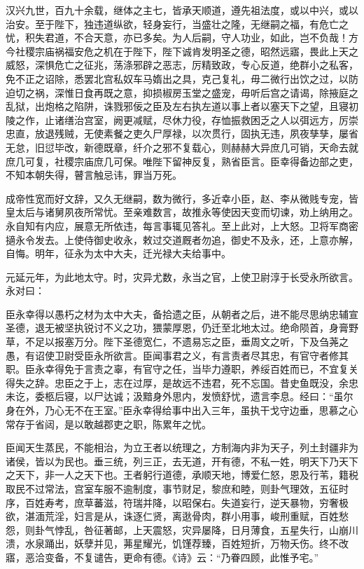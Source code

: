 \documentclass[]{article}
\begin{document}
汉兴九世，百九十余载，继体之主七，皆承天顺道，遵先祖法度，或以中兴，或以治安。至于陛下，独违道纵欲，轻身妄行，当盛壮之隆，无继嗣之福，有危亡之忧，积失君道，不合天意，亦已多矣。为人后嗣，守人功业，如此，岂不负哉！方今社稷宗庙祸福安危之机在于陛下，陛下诚肯发明圣之德，昭然远寤，畏此上天之威怒，深惧危亡之征兆，荡涤邪辟之恶志，厉精致政，专心反道，绝群小之私客，免不正之诏除，悉罢北宫私奴车马媠出之具，克己复礼，毋二微行出饮之过，以防迫切之祸，深惟日食再既之意，抑损椒房玉堂之盛宠，毋听后宫之请谒，除掖庭之乱狱，出炮格之陷阱，诛戮邪佞之臣及左右执左道以事上者以塞天下之望，且寝初陵之作，止诸缮治宫室，阙更减赋，尽休力役，存恤振救困乏之人以弭远方，厉崇忠直，放退残贼，无使素餐之吏久尸厚禄，以次贯行，固执无违，夙夜孳孳，屡省无怠，旧愆毕改，新德既章，纤介之邪不复载心，则赫赫大异庶几可销，天命去就庶几可复，社稷宗庙庶几可保。唯陛下留神反复，熟省臣言。臣幸得备边部之吏，不知本朝失得，瞽言触忌讳，罪当万死。

成帝性宽而好文辞，又久无继嗣，数为微行，多近幸小臣，赵、李从微贱专宠，皆皇太后与诸舅夙夜所常忧。至亲难数言，故推永等使因天变而切谏，劝上纳用之。永自知有内应，展意无所依违，每言事辄见答礼。至上此对，上大怒。卫将军商密擿永令发去。上使侍御史收永，敕过交道厩者勿追，御史不及永，还，上意亦解，自悔。明年，征永为太中大夫，迁光禄大夫给事中。

元延元年，为此地太守。时，灾异尤数，永当之官，上使卫尉淳于长受永所欲言。永对曰：

臣永幸得以愚朽之材为太中大夫，备拾遗之臣，从朝者之后，进不能尽思纳忠辅宣圣德，退无被坚执锐讨不义之功，猥蒙厚恩，仍迁至北地太过。绝命陨首，身膏野草，不足以报塞万分。陛下圣德宽仁，不遗易忘之臣，垂周文之听，下及刍荛之愚，有诏使卫尉受臣永所欲言。臣闻事君之义，有言责者尽其忠，有官守者修其职。臣永幸得免于言责之辜，有官守之任，当毕力遵职，养绥百姓而已，不宜复关得失之辞。忠臣之于上，志在过厚，是故远不违君，死不忘国。昔史鱼既没，余忠未讫，委柩后寝，以尸达诚；汲黯身外思内，发愤舒忧，遗言李息。经曰：``虽尔身在外，乃心无不在王室。''臣永幸得给事中出入三年，虽执干戈守边垂，思慕之心常存于省闼，是以敢越郡吏之职，陈累年之忧。

臣闻天生蒸民，不能相治，为立王者以统理之，方制海内非为天子，列土封疆非为诸侯，皆以为民也。垂三统，列三正，去无道，开有德，不私一姓，明天下乃天下之天下，非一人之天下也。王者躬行道德，承顺天地，博爱仁怒，恩及行苇，籍税取民不过常法，宫室车服不逾制度，事节财足，黎庶和睦，则卦气理效，五征时序，百姓寿考，庶草蕃滋，符瑞并降，以昭保右。失道妄行，逆天暴物，穷奢极欲，湛湎荒淫，妇言是从，诛逐仁贤，离逖骨肉，群小用事，峻刑重赋，百姓愁怨，则卦气悖乱，咎征著邮，上天震怒，灾异屡降，日月薄食，五星失行，山崩川溃，水泉踊出，妖孽并见，茀星耀光，饥馑荐臻，百姓短折，万物夭伤。终不改寤，恶洽变备，不复谴告，更命有德。《诗》云：``乃眷四顾，此惟予宅。''
\end{document}
